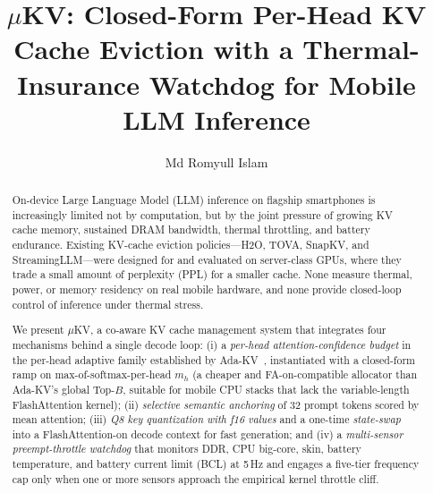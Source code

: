 \documentclass[sigconf, anonymous=false, screen=true]{acmart}
\begin{document}
\title{$\mu$KV: Closed-Form Per-Head KV Cache Eviction with a Thermal-Insurance Watchdog for Mobile LLM Inference}

\author{Md Romyull Islam}

\begin{abstract}
On-device Large Language Model (LLM) inference on flagship smartphones is increasingly limited not by computation, but by the joint pressure of growing KV cache memory, sustained DRAM bandwidth, thermal throttling, and battery endurance. Existing KV-cache eviction policies---H2O, TOVA, SnapKV, and StreamingLLM---were designed for and evaluated on server-class GPUs, where they trade a small amount of perplexity (PPL) for a smaller cache. None measure thermal, power, or memory residency on real mobile hardware, and none provide closed-loop control of inference under thermal stress.

We present \textsc{$\mu$KV}, a co-aware KV cache management system that integrates four mechanisms behind a single decode loop: (i) a \emph{per-head attention-confidence budget} in the per-head adaptive family established by Ada-KV~\cite{feng2025adakv}, instantiated with a closed-form ramp on max-of-softmax-per-head $m_h$ (a cheaper and FA-on-compatible allocator than Ada-KV's global Top-$B$, suitable for mobile CPU stacks that lack the variable-length FlashAttention kernel); (ii) \emph{selective semantic anchoring} of 32 prompt tokens scored by mean attention; (iii) \emph{Q8 key quantization with f16 values} and a one-time \emph{state-swap} into a FlashAttention-on decode context for fast generation; and (iv) a \emph{multi-sensor preempt-throttle watchdog} that monitors DDR, CPU big-core, skin, battery temperature, and battery current limit (BCL) at 5\,Hz and engages a five-tier frequency cap only when one or more sensors approach the empirical kernel throttle cliff.


\end{abstract}
\end{document}
